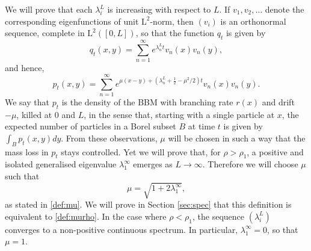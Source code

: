 \documentclass[11pt]{article}
\theoremstyle{plain}
\newcommand\linf{\lambda_1^\infty}
\begin{document}
We will prove that each $\lambda_i^L$ is increasing with respect to $L$. If $v_1,v_2,\ldots$ denote the corresponding eigenfunctions of unit $\mathrm{L}^2$-norm, then $(v_i)$ is an orthonormal sequence,  complete in $\mathrm{L}^2([0,L])$, so that the function $q_t$ is given by
\[
q_t(x,y) = \sum_{n=1}^\infty e^{\lambda_n^L t} v_n(x)v_n(y),
\]
and hence,
\begin{equation}
p_t(x,y) = \sum_{n=1}^\infty e^{\mu(x-y) + (\lambda_n^L + \frac{1}{2}-\mu^2/2) t} v_n(x)v_n(y)\label{def:pt}.
\end{equation}
We say that $p_t$ is the density of the BBM with branching rate $r(x)$ and drift $-\mu$, killed at $0$ and $L$, in the sense that, starting with a single particle at $x$, the expected number of particles in a Borel subset $B$ at time $t$ is given by $\int_B p_t(x,y)dy$.
From these observations, $\mu$ will be chosen in such a way that the mass loss in $p_t$ stays controlled. Yet we will prove that, for $\rho>\rho_1$, a positive and isolated generalised eigenvalue $\linf$ emerges as $L\to \infty$. Therefore we will choose $\mu$ such that 
\begin{equation*}
\mu=\sqrt{1+2\linf},
\end{equation*}
as stated in \eqref{def:mu}. We will prove in Section \ref{sec:spec} that this definition is equivalent to \eqref{def:murho}.
 In the case where $\rho<\rho_1$, the sequence $(\lambda_i^L)$ converges to a non-positive continuous spectrum. In particular, $\linf=0$, so that $\mu=1$.
\end{document}
